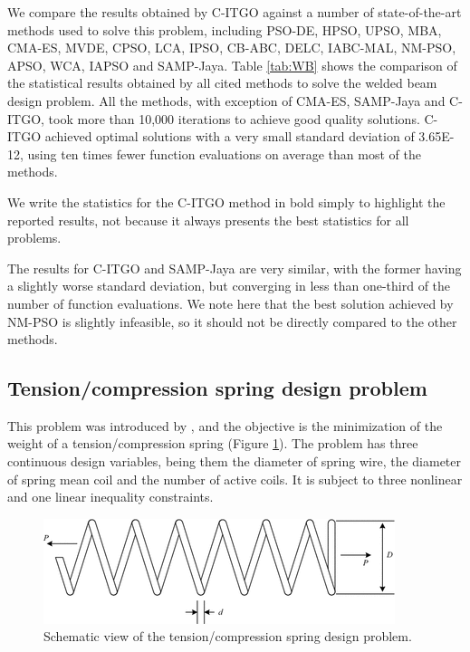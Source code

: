 We compare the results obtained by C-ITGO against a number of state-of-the-art methods used to solve this problem, including PSO-DE, HPSO, UPSO, MBA, CMA-ES, MVDE, CPSO, LCA, IPSO, CB-ABC, DELC, IABC-MAL, NM-PSO, APSO, WCA, IAPSO and SAMP-Jaya. Table \ref{tab:WB} shows the comparison of the statistical results obtained by all cited methods to solve the welded beam design problem. All the methods, with exception of CMA-ES, SAMP-Jaya and C-ITGO, took more than 10,000 iterations to achieve good quality solutions. C-ITGO achieved optimal solutions with a very small standard deviation of 3.65E-12, using ten times fewer function evaluations on average than most of the methods.

We write the statistics for the C-ITGO method in bold simply to highlight the reported results, not because it always presents the best statistics for all problems.



The results for C-ITGO and SAMP-Jaya are very similar, with the former having a slightly worse standard deviation, but converging in less than one-third of the number of function evaluations. We note here that the best solution achieved by NM-PSO is slightly infeasible, so it should not be directly compared to the other methods.




\subsection{Tension/compression spring design problem}

This problem was introduced by \cite{TC}, and the objective is the minimization of the weight of a tension/compression spring (Figure \ref{fig:TC}). The problem has three continuous design variables, being them the diameter of spring wire, the diameter of spring mean coil and the number of active coils. It is subject to three nonlinear and one linear inequality constraints.

\begin{figure}[h]
\begin{center}
\includegraphics[scale=0.6]{Imgs/TC.png}
\end{center}
\captionsetup{justification=centering}
\caption{Schematic view of the tension/compression spring design problem.}\label{fig:TC}
\end{figure}


